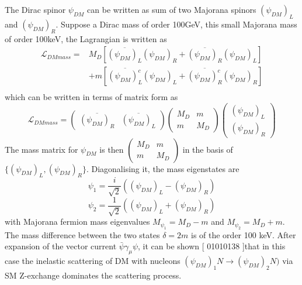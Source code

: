 \documentclass[12pt]{article}
\begin{document}
The Dirac spinor  $\psi_{DM} $ can be written as sum of two Majorana spinors $(\psi_{DM})_L $ and $(\psi_{DM})_R $. Suppose a Dirac mass of order 100GeV, this small Majorana mass of order 100keV, the Lagrangian is written as 
\begin{equation}
\begin{aligned}
\mathcal L_{DMmass} =
& M_D [ \overline{ (\psi_{DM})_L } (\psi_{DM})_R + \overline{ (\psi_{DM})_R } (\psi_{DM})_L ] \\
&+ m [ \overline{ (\psi_{DM})_L^c } (\psi_{DM})_L +  \overline{ (\psi_{DM})_R^c } (\psi_{DM})_R ] \\ 
\end{aligned}
\end{equation}
which can be written in terms of matrix form as 
$$
\mathcal L_{DMmass} =
\begin{pmatrix}
\overline{ (\psi_{DM})_R }& \overline{ (\psi_{DM})_L }
\end{pmatrix}
\begin{pmatrix}
M_D & m\\
m & M_D 
\end{pmatrix}
\begin{pmatrix}
 (\psi_{DM})_L\\
 (\psi_{DM})_R
\end{pmatrix}
$$
The mass matrix for $\psi_{DM}$ is then
$\begin{pmatrix}
M_D & m\\
m & M_D 
\end{pmatrix}$
in the basis of $ \{ (\psi_{DM})_L , (\psi_{DM})_R\} $. Diagonalising it, the mass eigenstates are 
$$
\psi_1 = \frac{i}{\sqrt 2} ((\psi_{DM})_L -  (\psi_{DM})_R)
$$
$$
\psi_2 = \frac{1}{\sqrt 2} ((\psi_{DM})_L +  (\psi_{DM})_R)
$$
with Majorana fermion mass eigenvalues $M_{\psi_1} = M_D - m$ and  $M_{\psi_2} = M_D + m$. The mass difference between the two states $\delta = 2m$ is of the order 100 keV. After expansion of the vector current $\bar \psi \gamma_\mu \psi $, it can be shown [ 01010138 ]that in this case the inelastic scattering of DM with nucleons $(\psi_{DM})_1N \rightarrow (\psi_{DM})_2N)$  via SM Z-exchange dominates the scattering process. 
\end{document}
